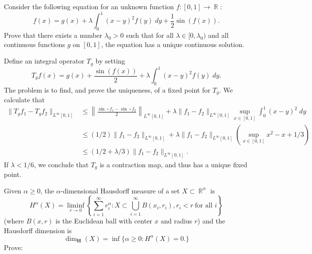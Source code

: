 \documentclass[answers]{exam}
\DeclareMathOperator{\RR}{\mathbb{R}}
\theoremstyle{problemstyle}
\newcommand{\1}[1]{\textbf{1}_{\left[#1\right]}} %
\begin{document}
\begin{questions}

\question Consider the following equation for an unknown function $f: [0,1] \to \RR$:
%
\[ f(x) = g(x) + \lambda \int_0^1 (x - y)^2 f(y)\; dy + \frac{1}{2} \sin(f(x)). \]
%
Prove that there exists a number $\lambda_0 > 0$ such that for all $\lambda \in [0,\lambda_0)$ and all continuous functions $g$ on $[0,1]$, the equation has a unique continuous solution.
\begin{solution}
	Define an integral operator $T_g$ by setting
	\[ T_g f(x) = g(x) + \frac{\sin(f(x))}{2} + \lambda \int_0^1 (x - y)^2 f(y)\; dy. \]
	The problem is to find, and prove the uniqueness, of a fixed point for $T_g$. We calculate that
	\begin{align*}
		\| T_g f_1 - T_g f_2 \|_{L^\infty[0,1]} &\leq \left\| \frac{\sin \circ f_1 - \sin \circ f_2}{2} \right\|_{L^\infty[0,1]} + \lambda \| f_1 - f_2 \|_{L^\infty[0,1]} \sup_{x \in [0,1]} \int_0^1 (x - y)^2\; dy\\
		&\leq (1/2) \| f_1 - f_2 \|_{L^\infty[0,1]} + \lambda \| f_1 - f_2 \|_{L^\infty[0,1]} \left( \sup_{x \in [0,1]} x^2 - x + 1/3 \right)\\
		&\leq (1/2 + \lambda / 3) \| f_1 - f_2 \|_{L^\infty[0,1]}.
	\end{align*}
	If $\lambda < 1/6$, we conclude that $T_g$ is a contraction map, and thus has a unique fixed point.
\end{solution}

\question Given $\alpha \geq 0$, the $\alpha$-dimensional Hausdorff measure of a set $X \subset \RR^n$ is
%
\[ H^\alpha(X) = \liminf_{r \to 0} \left\{ \sum_{i = 1}^\infty r_i^\alpha : X \subset \bigcup_{i = 1}^\infty B(x_i,r_i), r_i < r\ \text{for all $i$} \right\} \]
%
(where $B(x,r)$ is the Euclidean ball with center $x$ and radius $r$) and the Hausdorff dimension is
%
\[ \dim_{\mathbf{H}}(X) = \inf \{ \alpha \geq 0: H^\alpha(X) = 0. \} \]
%
Prove:
%
\begin{parts}

\end{parts}
\end{questions}
\end{document}
